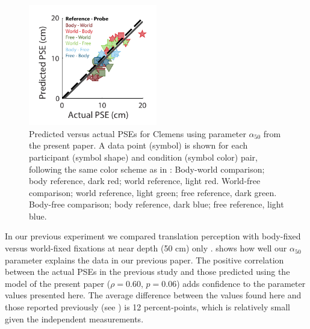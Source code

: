 \begin{figure}
    \includegraphics[width=0.5\textwidth]{src/paper4/p4_figure6.pdf}

    \caption{Predicted versus actual PSEs for Clemens \protect\citeyear{clemens2015a} using parameter $\alpha_{50}$ from the present paper. A data point (symbol) is shown for each participant (symbol shape) and condition (symbol color) pair, following the same color scheme as in \protect{}: Body-world comparison; body reference, dark red; world reference, light red. World-free comparison; world reference, light green; free reference, dark green. Body-free comparison; body reference, dark blue; free reference, light blue.}
    \label{p4:fig6}
\end{figure}

In our previous experiment we compared translation perception with body-fixed versus world-fixed fixations at near depth (50 \si{\centi\metre}) only \cite{clemens2015a}.  shows how well our $\alpha_{50}$ parameter explains the data in our previous paper. The positive correlation between the actual PSEs in the previous study and those predicted using the model of the present paper ($\rho = 0.60$, $p = 0.06$) adds confidence to the parameter values presented here. The average difference between the values found here and those reported previously (see ) is 12  percent-points, which is relatively small given the independent measurements.

